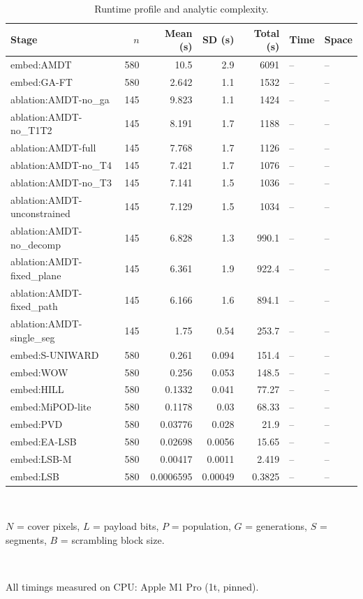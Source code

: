 \begin{table}[!t]
\centering
\caption{Runtime profile and analytic complexity.}
\label{tab:runtime}
\footnotesize
\begin{tabular}{lrrrrll}
\toprule
Stage & $n$ & Mean (s) & SD (s) & Total (s) & Time & Space \\
\midrule
embed:AMDT & 580 & 10.5 & 2.9 & 6091 & -- & -- \\
embed:GA-FT & 580 & 2.642 & 1.1 & 1532 & -- & -- \\
ablation:AMDT-no\_ga & 145 & 9.823 & 1.1 & 1424 & -- & -- \\
ablation:AMDT-no\_T1T2 & 145 & 8.191 & 1.7 & 1188 & -- & -- \\
ablation:AMDT-full & 145 & 7.768 & 1.7 & 1126 & -- & -- \\
ablation:AMDT-no\_T4 & 145 & 7.421 & 1.7 & 1076 & -- & -- \\
ablation:AMDT-no\_T3 & 145 & 7.141 & 1.5 & 1036 & -- & -- \\
ablation:AMDT-unconstrained & 145 & 7.129 & 1.5 & 1034 & -- & -- \\
ablation:AMDT-no\_decomp & 145 & 6.828 & 1.3 & 990.1 & -- & -- \\
ablation:AMDT-fixed\_plane & 145 & 6.361 & 1.9 & 922.4 & -- & -- \\
ablation:AMDT-fixed\_path & 145 & 6.166 & 1.6 & 894.1 & -- & -- \\
ablation:AMDT-single\_seg & 145 & 1.75 & 0.54 & 253.7 & -- & -- \\
embed:S-UNIWARD & 580 & 0.261 & 0.094 & 151.4 & -- & -- \\
embed:WOW & 580 & 0.256 & 0.053 & 148.5 & -- & -- \\
embed:HILL & 580 & 0.1332 & 0.041 & 77.27 & -- & -- \\
embed:MiPOD-lite & 580 & 0.1178 & 0.03 & 68.33 & -- & -- \\
embed:PVD & 580 & 0.03776 & 0.028 & 21.9 & -- & -- \\
embed:EA-LSB & 580 & 0.02698 & 0.0056 & 15.65 & -- & -- \\
embed:LSB-M & 580 & 0.00417 & 0.0011 & 2.419 & -- & -- \\
embed:LSB & 580 & 0.0006595 & 0.00049 & 0.3825 & -- & -- \\
\bottomrule
\end{tabular}
\\[2pt] \parbox{\linewidth}{\scriptsize $N$ = cover pixels, $L$ = payload bits, $P$ = population, $G$ = generations, $S$ = segments, $B$ = scrambling block size.}
\\[2pt] \parbox{\linewidth}{\scriptsize All timings measured on CPU: Apple M1 Pro (1t, pinned).}
\end{table}
